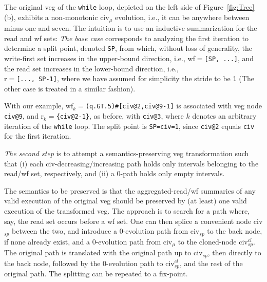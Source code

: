 \documentclass{sig-alternate}
\begin{document}
The original {\sc veg} of the {\tt while} loop, depicted on the left 
side of Figure~\ref{fig:Tree}(b), exhibits a non-monotonic {\sc civ}$_\mu$
evolution, i.e., it can be anywhere between minus one and seven.
%
The intuition is to use an inductive summarization for the read and {\sc wf} sets:
{\em The base case} corresponds to analyzing the first iteration to determine a split point, 
denoted {\tt SP}, from which, without loss of generality, the write-first set increases in the 
upper-bound direction, i.e., {\sc wf}$=${\tt[SP, ...]}, and the read set increases in the lower-bound
direction, i.e., \\
{\sc r}$=${\tt [..., SP-1]}, where we have assumed for simplicity the stride to be {\tt 1}
(The other case is treated in a similar fashion).

With our example, {\sc wf}$_k=${\tt (q.GT.5)\#[civ@2,civ@9-1]}
is associated with {\sc veg} node {\tt civ@9}, and 
{\sc r}$_k=${\tt \{civ@2-1\}}, as before, with {\tt civ@3}, 
where $k$ denotes an arbitrary iteration of the {\tt while} loop.
The split point is {\tt SP=civ=1}, since {\tt civ@2} equals {\tt civ} 
for the first iteration.



{\em The second step} is to attempt a semantics-preserving {\sc veg} transformation
such that (i) each {\sc civ}-decreasing/increasing path holds only intervals 
belonging to the read/{\sc wf} set, respectively, and (ii) a $0$-path holds
only empty intervals.

The semantics to be preserved is that the aggregated-read/{\sc wf} summaries of
any valid execution of the original {\sc veg} should be preserved by (at least) one 
valid execution of the transformed {\sc veg}.  The approach is
to search for a path where, say, the read set occurs before a {\sc wf} set.
One can then splice a convenient node {\sc civ}$_{sp}$ between the two, and 
introduce a $0$-evolution path from {\sc civ}$_{sp}$ to the back node, if none already exist,
and a $0$-evolution path from {\sc civ}$_\mu$ to the cloned-node {\sc civ}$_{sp}^{cl}$.
The original path is translated with the original path up to {\sc civ}$_{sp}$,
then directly to the back node, followed by the $0$-evolution path to  
{\sc civ}$_{sp}^{cl}$, and the rest of the original path. The splitting can be
repeated to a fix-point.
\end{document}
